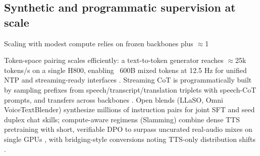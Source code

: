 \documentclass{article}
\begin{document}
\subsection{Synthetic and programmatic supervision at scale} \label{subsec:Synthetic and programmatic supervision at scale}
Scaling with modest compute relies on frozen backbones plus $\approx$1%

Token-space pairing scales efficiently: a text-to-token generator reaches $\approx$25k tokens/s on a single H800, enabling ~600B mixed tokens at 12.5 Hz for unified NTP and streaming-ready interfaces \cite{zeng2024scalingspeechtextpretrainingsyntheticint}. Streaming CoT is programmatically built by sampling prefixes from speech/transcript/translation triplets with speech-CoT prompts, and transfers across backbones \cite{guo2025streamuniachievingstreamingspeechtransla}. Open blends (LLaSO, Omni VoiceTextBlender) synthesize millions of instruction pairs for joint SFT and seed duplex chat skills; compute-aware regimens (Slamming) combine dense TTS pretraining with short, verifiable DPO to surpass uncurated real-audio mixes on single GPUs \cite{peng2025voicetextblenderaugmentinglargelanguagem,fang2025llamaomniseamlessspeechinteractionlargel,maimon2025slammingtrainingspeechlanguagemodelonegp}, with bridging-style conversions noting TTS-only distribution shifts \cite{wang2023slmbridgethingapbetweenspeechtextfoundat}.
\end{document}
